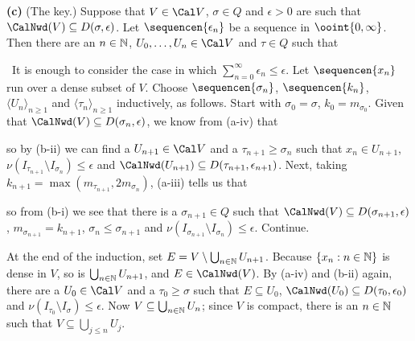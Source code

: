 {\medskip

{\bf (c)} (The key.)  Suppose that $V\in\Cal V$, $\sigma\in Q$
and $\epsilon>0$ are such that $\CalNwd(V)\subseteq D(\sigma,\epsilon)$.
Let $\sequencen{\epsilon_n}$ be a sequence in $\ooint{0,\infty}$.
Then there are an
$n\in\Bbb N$, $U_0,\ldots,U_n\in\Cal V$ and $\tau\in Q$ such
that



\noindent\Prf\ It is enough to consider the case in which
$\sum_{n=0}^{\infty}\epsilon_n\le\epsilon$.
Let $\sequencen{x_n}$ run over a dense subset of $V$.
Choose $\sequencen{\sigma_n}$, $\sequencen{k_n}$,
$\langle U_n\rangle_{n\ge 1}$ and $\langle\tau_n\rangle_{n\ge 1}$
inductively, as follows.   Start with
$\sigma_0=\sigma$, $k_0=m_{\sigma_0}$.
Given that $\CalNwd(V)\subseteq D(\sigma_n,\epsilon)$,
we know from (a-iv) that


\noindent so by (b-ii) we can find a $U_{n+1}\in\Cal V$ and a
$\tau_{n+1}\ge\sigma_n$ such that $x_n\in U_{n+1}$,
$\nu(I_{\tau_{n+1}}\setminus I_{\sigma_n})\le\epsilon$ and
$\CalNwd(U_{n+1})\subseteq D(\tau_{n+1},\epsilon_{n+1})$.
Next, taking $k_{n+1}=\max(m_{\tau_{n+1}},2m_{\sigma_n})$,
(a-iii) tells us that


\noindent so from (b-i) we see that there is a $\sigma_{n+1}\in Q$ such
that $\CalNwd(V)\subseteq D(\sigma_{n+1},\epsilon)$,
$m_{\sigma_{n+1}}=k_{n+1}$, $\sigma_n\le\sigma_{n+1}$ and
$\nu(I_{\sigma_{n+1}}\setminus I_{\sigma_n})\le\epsilon$.   Continue.

At the end of the induction, set $E=V\setminus\bigcup_{n\in\Bbb N}U_{n+1}$.
Because $\{x_n:n\in\Bbb N\}$ is dense in $V$, so is
$\bigcup_{n\in\Bbb N}U_{n+1}$, and $E\in\CalNwd(V)$.   By (a-iv) and
(b-ii) again, there are a $U_0\in\Cal V$ and a $\tau_0\ge\sigma$ such
that $E\subseteq U_0$, $\CalNwd(U_0)\subseteq D(\tau_0,\epsilon_0)$ and
$\nu(I_{\tau_0}\setminus I_{\sigma})\le\epsilon$.   Now
$V\subseteq\bigcup_{n\in\Bbb N}U_n$;  since $V$ is compact, there is an
$n\in\Bbb N$ such that $V\subseteq\bigcup_{j\le n}U_j$.

}
